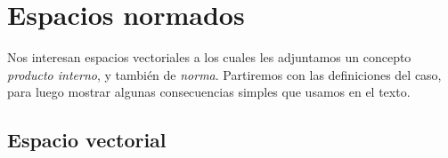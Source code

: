 

\chapter{Espacios normados}
\label{apx:espacios-normados}

  Nos interesan espacios vectoriales
  a los cuales les adjuntamos un concepto \emph{producto interno},
  y también de \emph{norma}.
  Partiremos con las definiciones del caso,
  para luego mostrar algunas consecuencias simples que usamos en el texto.

\section{Espacio vectorial}
\label{sec:espacio-vectorial}

